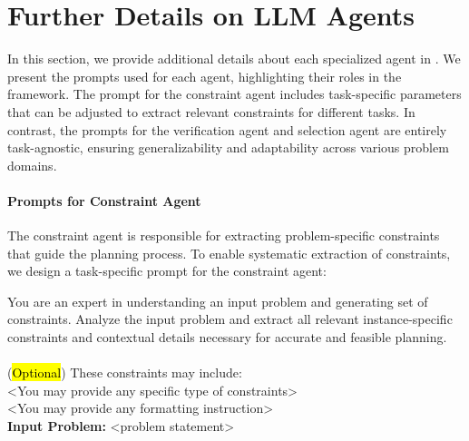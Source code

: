 \section{Further Details on LLM Agents}
\label{app:llm_agents}

In this section, we provide additional details about each specialized agent in \plangen{}. We present the prompts used for each agent, highlighting their roles in the framework. The prompt for the constraint agent includes task-specific parameters that can be adjusted to extract relevant constraints for different tasks. In contrast, the prompts for the verification agent and selection agent are entirely task-agnostic, ensuring generalizability and adaptability across various problem domains.

\paragraph{Prompts for Constraint Agent}
The constraint agent is responsible for extracting problem-specific constraints that guide the planning process. To enable systematic extraction of constraints, we design a task-specific prompt for the constraint agent:


\begin{tcolorbox}[boxrule=0pt, frame hidden, title=Prompt, breakable, sharp corners, borderline west={0pt}{0pt}{black!50}, title style={
        colback=black!50, %
        colframe=black!50, %
        coltitle=black %
    }]
You are an expert in understanding an input problem and generating set of constraints. Analyze the input problem and extract all relevant instance-specific constraints and contextual details necessary for accurate and feasible planning. 
\\
\\
(\hl{Optional}) These constraints may include:
\\

<You may provide any specific type of constraints>
\\

<You may provide any formatting instruction>
\\

\textbf{Input Problem:} <problem statement>
\end{tcolorbox}

